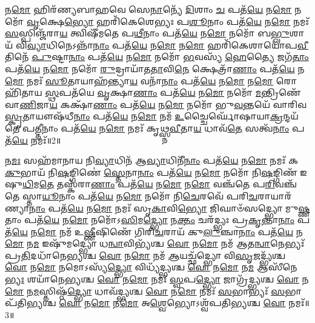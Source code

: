 𑌨\-\ul{𑌮𑍋} 𑌹𑌿𑌰᳴𑌣𑍍𑌯𑌬𑌾𑌹𑌵𑍇 𑌸𑍇\-\ul{𑌨𑌾}\-𑌨𑍍𑌯𑍇᳴ \ul{𑌦𑌿}\-𑌶𑌾𑌂 \ul{𑌚} 𑌪𑌤᳴\-\ul{𑌯𑍇} 𑌨\-\ul{𑌮𑍋} 𑌨𑌮𑍋᳴ \ul{𑌵𑍃}\-𑌕𑍍𑌷𑍇\-\ul{𑌭𑍍𑌯𑍋} 𑌹𑌰𑌿᳴𑌕𑍇𑌶𑍇𑌭𑍍𑌯𑌃 𑌪\-\ul{𑌶𑍂}\-𑌨𑌾𑌂 𑌪𑌤᳴\-\ul{𑌯𑍇} 𑌨\-\ul{𑌮𑍋} 𑌨𑌮𑌃᳴ \ul{𑌸}\-𑌸𑍍𑌪𑌿𑌞𑍍𑌜᳴𑌰𑌾\-\ul{𑌯} 𑌤𑍍𑌵𑌿𑌷𑍀᳴𑌮𑌤𑍇 𑌪\-\ul{𑌥𑍀}\-𑌨𑌾𑌂 𑌪𑌤᳴\-\ul{𑌯𑍇} 𑌨\-\ul{𑌮𑍋} 𑌨𑌮𑍋᳴ 𑌬\-\ul{𑌭𑍍𑌲𑍁}\-𑌶𑌾𑌯᳴ 𑌵𑌿\-\ul{𑌵𑍍𑌯𑌾}\-𑌧𑌿𑌨𑍇\-𑌽𑌨𑍍𑌨𑌾᳴\-\ul{𑌨𑌾𑌂} 𑌪𑌤᳴\-\ul{𑌯𑍇} 𑌨\-\ul{𑌮𑍋} 𑌨\-\ul{𑌮𑍋} 𑌹𑌰𑌿᳴𑌕𑍇𑌶𑌾𑌯𑍋𑌪\-\ul{𑌵𑍀}\-𑌤𑌿𑌨𑍇᳴ \ul{𑌪𑍁}\-𑌷𑍍𑌟𑌾\-\ul{𑌨𑌾𑌂} 𑌪𑌤᳴\-\ul{𑌯𑍇} 𑌨\-\ul{𑌮𑍋} 𑌨𑌮𑍋᳴ \ul{𑌭}\-𑌵𑌸𑍍𑌯᳴ \ul{𑌹𑍇}\-𑌤𑍍𑌯𑍈 𑌜𑌗᳴\-\ul{𑌤𑌾𑌂} 𑌪𑌤᳴\-\ul{𑌯𑍇} 𑌨\-\ul{𑌮𑍋} 𑌨𑌮𑍋᳴ \ul{𑌰𑍁}\-𑌦𑍍𑌰𑌾𑌯𑌾᳴𑌤\-\ul{𑌤𑌾}\-𑌵𑌿\-\ul{𑌨𑍇} 𑌕𑍍𑌷𑍇𑌤𑍍𑌰𑌾᳴\-\ul{𑌣𑌾𑌂} 𑌪𑌤᳴\-\ul{𑌯𑍇} 𑌨\-\ul{𑌮𑍋} 𑌨𑌮𑌃᳴ \ul{𑌸𑍂}\-𑌤𑌾𑌯𑌾𑌹᳴𑌨𑍍𑌤𑍍𑌯𑌾\-\ul{𑌯} 𑌵𑌨𑌾᳴\-\ul{𑌨𑌾𑌂} 𑌪𑌤᳴\-\ul{𑌯𑍇} 𑌨\-\ul{𑌮𑍋} 𑌨\-\ul{𑌮𑍋} 𑌰𑍋𑌹𑌿᳴𑌤𑌾𑌯 \ul{𑌸𑍍𑌥}\-𑌪𑌤᳴𑌯𑍇 \ul{𑌵𑍃}\-𑌕𑍍𑌷𑌾\-\ul{𑌣𑌾𑌂} 𑌪𑌤᳴\-\ul{𑌯𑍇} 𑌨\-\ul{𑌮𑍋} 𑌨𑌮𑍋᳴ \ul{𑌮}\-𑌨𑍍𑌤𑍍𑌰𑌿𑌣𑍇᳴ 𑌵𑌾\-\ul{𑌣𑌿}\-𑌜𑌾\-\ul{𑌯} 𑌕𑌕𑍍𑌷𑌾᳴\-\ul{𑌣𑌾𑌂} 𑌪𑌤᳴\-\ul{𑌯𑍇} 𑌨\-\ul{𑌮𑍋} 𑌨𑌮𑍋᳴ 𑌭𑍁\-\ul{𑌵}\-𑌨𑍍𑌤𑌯𑍇᳴ 𑌵𑌾𑌰𑌿𑌵\-\ul{𑌸𑍍𑌕𑍃}\-𑌤𑌾𑌯𑍗𑌷᳴𑌧𑍀\-\ul{𑌨𑌾𑌂} 𑌪𑌤᳴\-\ul{𑌯𑍇} 𑌨\-\ul{𑌮𑍋} 𑌨𑌮᳴ \ul{𑌉}\-𑌚𑍍𑌚𑍈𑌰𑍍𑌘𑍋᳴𑌷𑌾\-𑌯𑌾\-\ul{𑌕𑍍𑌰}\-𑌨𑍍𑌦𑌯᳴𑌤𑍇 𑌪\-\ul{𑌤𑍍𑌤𑍀}\-𑌨𑌾𑌂 𑌪𑌤᳴\-\ul{𑌯𑍇} 𑌨\-\ul{𑌮𑍋} 𑌨𑌮𑌃᳴ 𑌕𑍃𑌥𑍍𑌸𑍍𑌨\-\ul{𑌵𑍀}\-𑌤𑌾\-\ul{𑌯} 𑌧𑌾𑌵᳴\-\ul{𑌤𑍇} 𑌸𑌤𑍍𑌵᳴\-\ul{𑌨𑌾𑌂} 𑌪𑌤᳴\-\ul{𑌯𑍇} 𑌨𑌮𑌃᳴॥2॥ 


𑌨\-\ul{𑌮𑌃} 𑌸𑌹᳴𑌮𑌾𑌨𑌾𑌯 𑌨𑌿\-\ul{𑌵𑍍𑌯𑌾}\-𑌧𑌿𑌨᳴ 𑌆\-\ul{𑌵𑍍𑌯𑌾}\-𑌧𑌿𑌨𑍀᳴\-\ul{𑌨𑌾𑌂} 𑌪𑌤᳴\-\ul{𑌯𑍇} 𑌨\-\ul{𑌮𑍋} 𑌨𑌮𑌃᳴ 𑌕\-\ul{𑌕𑍁}\-𑌭𑌾𑌯᳴ 𑌨𑌿\-\ul{𑌷}\-𑌙𑍍𑌗𑌿𑌣𑍇॑ \ul{𑌸𑍍𑌤𑍇}\-𑌨𑌾\-\ul{𑌨𑌾𑌂} 𑌪𑌤᳴\-\ul{𑌯𑍇} 𑌨\-\ul{𑌮𑍋} 𑌨𑌮𑍋᳴ 𑌨𑌿\-\ul{𑌷}\-𑌙𑍍𑌗𑌿𑌣᳴ 𑌇𑌷𑍁\-\ul{𑌧𑌿}\-𑌮\-\ul{𑌤𑍇} 𑌤𑌸𑍍𑌕᳴𑌰𑌾\-\ul{𑌣𑌾𑌂} 𑌪𑌤᳴\-\ul{𑌯𑍇} 𑌨\-\ul{𑌮𑍋} 𑌨\-\ul{𑌮𑍋} 𑌵𑌞𑍍𑌚᳴𑌤𑍇 𑌪\-\ul{𑌰𑌿}\-𑌵𑌞𑍍𑌚᳴𑌤𑍇 𑌸𑍍𑌤𑌾\-\ul{𑌯𑍂}\-𑌨𑌾𑌂 𑌪𑌤᳴\-\ul{𑌯𑍇} 𑌨\-\ul{𑌮𑍋} 𑌨𑌮𑍋᳴ 𑌨𑌿\-\ul{𑌚𑍇}\-𑌰𑌵𑍇᳴ 𑌪𑌰𑌿\-\ul{𑌚}\-𑌰𑌾𑌯𑌾𑌰᳴𑌣𑍍𑌯𑌾\-\ul{𑌨𑌾𑌂} 𑌪𑌤᳴\-\ul{𑌯𑍇} 𑌨\-\ul{𑌮𑍋} 𑌨𑌮𑌃᳴ 𑌸𑍃\-\ul{𑌕𑌾}\-𑌵𑌿\-\ul{𑌭𑍍𑌯𑍋} 𑌜𑌿𑌘𑌾𑍞᳴𑌸𑌦𑍍𑌭𑍍𑌯𑍋 𑌮𑍁\-\ul{𑌷𑍍𑌣}\-𑌤𑌾𑌂 𑌪𑌤᳴\-\ul{𑌯𑍇} 𑌨\-\ul{𑌮𑍋} 𑌨𑌮𑍋᳴𑌽\-\ul{𑌸𑌿}\-𑌮\-\ul{𑌦𑍍𑌭𑍍𑌯𑍋} 𑌨\-\ul{𑌕𑍍𑌤𑌂} 𑌚𑌰᳴𑌦𑍍𑌭𑍍𑌯𑌃 𑌪𑍍𑌰\-\ul{𑌕𑍃}\-𑌨𑍍𑌤𑌾\-\ul{𑌨𑌾𑌂} 𑌪𑌤᳴\-\ul{𑌯𑍇} 𑌨\-\ul{𑌮𑍋} 𑌨𑌮᳴ 𑌉\-\ul{𑌷𑍍𑌣𑍀}\-𑌷𑌿𑌣𑍇᳴ 𑌗𑌿𑌰𑌿\-\ul{𑌚}\-𑌰𑌾𑌯᳴ 𑌕𑍁\-\ul{𑌲𑍁}\-𑌞𑍍𑌚𑌾\-\ul{𑌨𑌾𑌂} 𑌪𑌤᳴\-\ul{𑌯𑍇} 𑌨\-\ul{𑌮𑍋} 𑌨\-\ul{𑌮} 𑌇𑌷𑍁᳴𑌮𑌦𑍍𑌭𑍍𑌯𑍋 𑌧\-\ul{𑌨𑍍𑌵𑌾}\-𑌵𑌿𑌭𑍍𑌯᳴𑌶𑍍𑌚 \ul{𑌵𑍋} 𑌨\-\ul{𑌮𑍋} 𑌨𑌮᳴ 𑌆𑌤\-\ul{𑌨𑍍𑌵𑌾}\-𑌨𑍇𑌭𑍍𑌯𑌃᳴ 𑌪𑍍𑌰\-\ul{𑌤𑌿}\-𑌦𑌧𑌾᳴𑌨𑍇𑌭𑍍𑌯𑌶𑍍𑌚 \ul{𑌵𑍋} 𑌨\-\ul{𑌮𑍋} 𑌨𑌮᳴ \ul{𑌆}\-𑌯𑌚𑍍𑌛᳴𑌦𑍍𑌭𑍍𑌯𑍋 𑌵𑌿\-\ul{𑌸𑍃}\-𑌜𑌦𑍍𑌭𑍍𑌯᳴𑌶𑍍𑌚 \ul{𑌵𑍋} 𑌨\-\ul{𑌮𑍋} 𑌨𑌮𑍋𑌽𑌸𑍍𑌯᳴\-\ul{𑌦𑍍𑌭𑍍𑌯𑍋} 𑌵𑌿𑌧𑍍𑌯᳴𑌦𑍍𑌭𑍍𑌯𑌶𑍍𑌚 \ul{𑌵𑍋} 𑌨\-\ul{𑌮𑍋} 𑌨\-\ul{𑌮} 𑌆𑌸𑍀᳴𑌨𑍇\-\ul{𑌭𑍍𑌯𑌃} 𑌶𑌯𑌾᳴𑌨𑍇𑌭𑍍𑌯𑌶𑍍𑌚 \ul{𑌵𑍋} 𑌨\-\ul{𑌮𑍋} 𑌨𑌮𑌃᳴ \ul{𑌸𑍍𑌵}\-𑌪\-\ul{𑌦𑍍𑌭𑍍𑌯𑍋} 𑌜𑌾𑌗𑍍𑌰᳴𑌦𑍍𑌭𑍍𑌯𑌶𑍍𑌚 \ul{𑌵𑍋} 𑌨\-\ul{𑌮𑍋} 𑌨\-\ul{𑌮}\-𑌸𑍍𑌤𑌿𑌷𑍍𑌠᳴\-\ul{𑌦𑍍𑌭𑍍𑌯𑍋} 𑌧𑌾𑌵᳴𑌦𑍍𑌭𑍍𑌯𑌶𑍍𑌚 \ul{𑌵𑍋} 𑌨\-\ul{𑌮𑍋} 𑌨𑌮𑌃᳴ \ul{𑌸}\-𑌭𑌾𑌭𑍍𑌯𑌃᳴ \ul{𑌸}\-𑌭𑌾𑌪᳴𑌤𑌿𑌭𑍍𑌯𑌶𑍍𑌚 \ul{𑌵𑍋} 𑌨\-\ul{𑌮𑍋} 𑌨\-\ul{𑌮𑍋} 𑌅\-\ul{𑌶𑍍𑌵𑍇}\-𑌭𑍍𑌯𑍋𑌽𑌶𑍍𑌵᳴𑌪𑌤𑌿𑌭𑍍𑌯𑌶𑍍𑌚 \ul{𑌵𑍋} 𑌨𑌮𑌃᳴॥3॥ 

